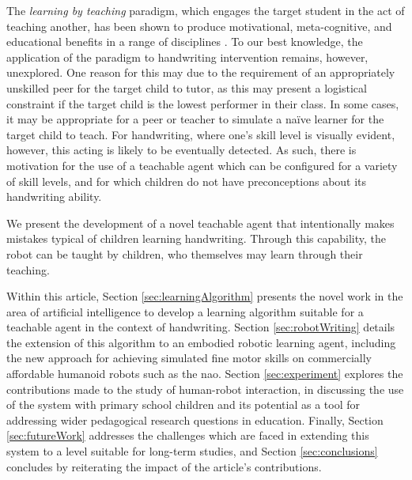 \documentclass{sig-alternate}
\begin{document}
The \emph{learning by teaching} paradigm, which engages the target student in
the act of teaching another, has been shown to produce motivational,
meta-cognitive, and educational benefits in a range of disciplines
\cite{Rohrbeck2003}. To our best knowledge, the application of the paradigm to
handwriting intervention remains, however, unexplored. One reason for this may due
to the requirement of an appropriately unskilled peer for the target child to
tutor, as this may present a logistical constraint if the target child is the
lowest performer in their class.  In some cases, it may be appropriate for a
peer or teacher to simulate a na\"ive learner for the target child to teach.
For handwriting, where one's skill level is visually evident, however, this
acting is likely to be eventually detected. As such, there is motivation for the
use of a teachable agent which can be configured for a variety of skill levels,
and for which children do not have preconceptions about its handwriting ability.

We present the development of a novel teachable agent
that intentionally makes mistakes typical of children learning
handwriting. Through this capability, the robot can be taught by
children, who themselves may learn through their teaching.


Within this article, Section \ref{sec:learningAlgorithm} presents the novel work in the area of
artificial intelligence to develop a learning algorithm suitable for a teachable
agent in the context of handwriting. Section \ref{sec:robotWriting} details the
extension of this algorithm to an embodied robotic learning agent, including the
new approach for achieving simulated fine motor skills on commercially
affordable humanoid robots such as the {\sc nao}. Section \ref{sec:experiment} explores the 
contributions made to the study of human-robot interaction, in discussing the
use of the system with primary school children and its potential as a tool for
addressing wider pedagogical research questions in education. Finally, Section \ref{sec:futureWork} addresses the challenges which are faced in extending this system to a level suitable for long-term studies, and Section \ref{sec:conclusions} concludes by reiterating the impact of the article's contributions.
\end{document}
